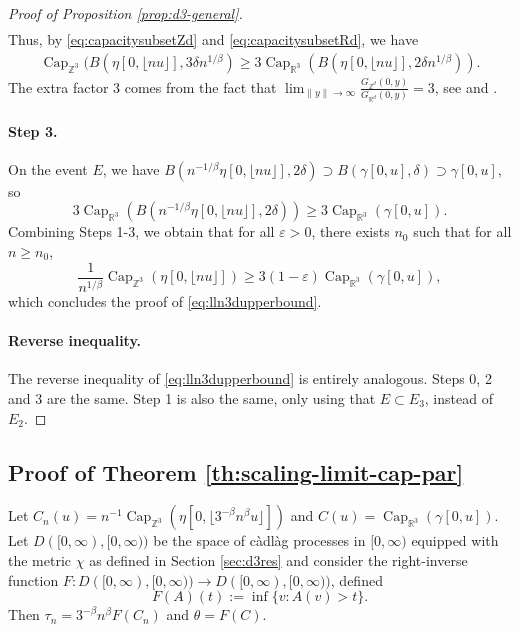 \documentclass{article}
\DeclareMathOperator{\C}{Cap}
\DeclareMathOperator{\Ca}{Cap}
\newcommand{\R}{\mathbb{R}}
\newcommand{\Z}{\mathbb{Z}}
\newcommand{\1}{\mathbf{1}}
\newcommand{\Cz}{\C_{\Z^3}}
\newcommand{\Cr}{\C_{\R^3}}
\theoremstyle{definition}
\numberwithin{equation}{section}
\numberwithin{theorem}{section}
\begin{document}
\begin{proof}[Proof of Proposition \ref{prop:d3-general}]
\begin{equation}
\begin{split}
    \end{split}
\end{equation}
Thus, by \eqref{eq:capacitysubsetZd} and \eqref{eq:capacitysubsetRd}, we have
\begin{equation}
    \begin{split}
        \Ca_{\Z^3}(B(\eta[0,\lfloor nu\rfloor],3\delta n^{1/\beta})\geq 3\Ca_{\R^3}(B(\eta[0,\lfloor nu\rfloor],2\delta n^{1/\beta})).
    \end{split}
\end{equation}
The extra factor 3 comes from the fact that $\lim_{\|y\|\rightarrow\infty}\frac{G_{\Z^d}(0,y)}{G_{\R^d}(0,y)}=3$, see \cite[Theorem 3.3]{morters2010brownian} and \cite[Theorem 4.3.1]{lawler2010random}. 


\paragraph{Step 3.}
On the event $E$, we have $B(n^{-1/\beta}\eta[0,\lfloor nu\rfloor],2\delta)\supset B(\gamma[0,u],\delta)\supset\gamma[0,u]$, so
\begin{equation}
    3\Ca_{\R^3}(B(n^{-1/\beta}\eta[0,\lfloor nu\rfloor],2\delta))\geq3\Ca_{\R^3}(\gamma[0,u]).
\end{equation}
Combining Steps 1-3, we obtain that for all $\varepsilon>0$, there exists $n_0$ such that for all $n\geq n_0$,
\begin{equation}
    \frac{1}{n^{1/\beta}}\Ca_{\Z^3}(\eta[0,\lfloor nu\rfloor])\geq3(1-\varepsilon)\Cr(\gamma[0,u]),
\end{equation}
which concludes the proof of \eqref{eq:lln3dupperbound}.

\paragraph{Reverse inequality.} The reverse inequality of \eqref{eq:lln3dupperbound} is entirely analogous. Steps 0, 2 and 3 are the same. Step 1 is also the same, only using that $E\subset E_3$, instead of $E_2$.
\end{proof}



\subsection{Proof of Theorem \ref{th:scaling-limit-cap-par}}
Let $C_n(u)=n^{-1}\Cz(\eta[0,\lfloor 3^{-\beta}n^{\beta}u\rfloor])$ and $C(u)=\Cr(\gamma[0,u])$. Let $D([0,\infty),[0,\infty))$ be the space of c\`adl\`ag processes in $[0,\infty)$ equipped with the metric $\chi$ as defined in Section \ref{sec:d3res}
and consider the right-inverse function $F\colon D([0,\infty),[0,\infty))\to D([0,\infty),[0,\infty))$, defined
\begin{equation}
    F(A)(t):=\inf\{v:A(v)> t\}.
\end{equation}
Then $\tau_n=3^{-\beta}n^{\beta}F(C_n)$ and $\theta=F(C)$. 
\end{document}
